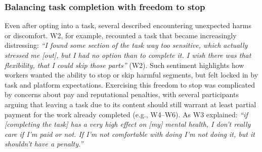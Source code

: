 \subsubsection{Balancing task completion with freedom to stop}
Even after opting into a task, several described encountering unexpected harms or discomfort.
W2, for example, recounted a task that became increasingly distressing: \textit{``I found some section of the task way too sensitive, which actually stressed me [out], but I had no option than to complete it. I wish there was that flexibility, that I could skip those parts''} (W2). Such sentiment highlights how workers wanted the ability to stop or skip harmful segments, but felt locked in by task and platform expectations. Exercising this freedom to stop was complicated by concerns about pay and reputational penalties, with several participants arguing that leaving a task due to its content should still warrant at least partial payment for the work already completed (e.g., W4–W6). As W3 explained: \textit{``if [completing the task] has a very high effect on [my] mental health, I don't really care if I'm paid or not. If I'm not comfortable with doing I'm not doing it, but it shouldn't have a penalty.''}

